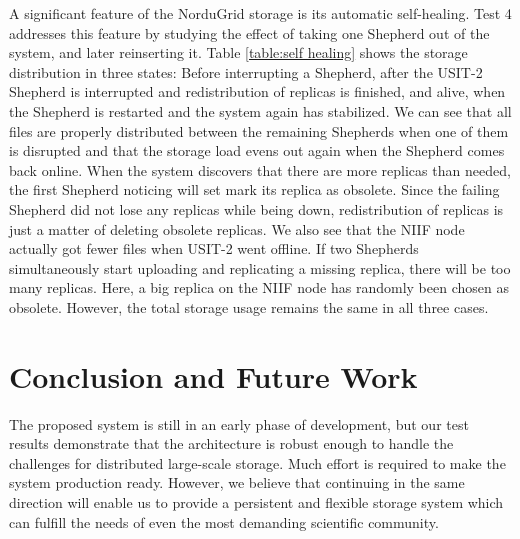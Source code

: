 \documentclass{llncs}
\begin{document}
A significant feature of the NorduGrid storage is its automatic self-healing. Test 4 addresses this feature by studying the effect of
taking one Shepherd out of the system, and later reinserting it. Table
\ref{table:self healing} shows the storage distribution in three
states: Before interrupting a Shepherd, after the USIT-2
Shepherd is interrupted and redistribution of replicas is finished, and
alive, when the Shepherd is restarted and the system again has stabilized. We
can see that all files are properly distributed between the remaining
Shepherds when one of them is disrupted and that the storage load evens out 
again when the Shepherd comes back online. When the
system discovers that there are more replicas than needed, the first
Shepherd noticing will set mark its replica as obsolete. Since the failing Shepherd did not lose any replicas while
being down, redistribution of replicas is just a matter of deleting
obsolete replicas. We also see that the NIIF node actually got fewer
files when USIT-2 went offline. If two Shepherds simultaneously
start uploading and replicating a missing replica, there will be too many
replicas. Here, a big replica on the NIIF node has randomly been chosen as
obsolete. However, the total storage usage remains the same in all
three cases.

\section{Conclusion and Future Work}
\label{Conclusion and Future Work}

The proposed system is still in an early phase of development, but our test
results demonstrate that the architecture is robust enough to handle
the challenges for distributed large-scale storage. Much
effort is required to make the system production
ready. However, we believe that continuing in the same direction
will enable us to provide a persistent  and flexible storage system
which can fulfill the needs of even the most demanding scientific community. 
\end{document}
